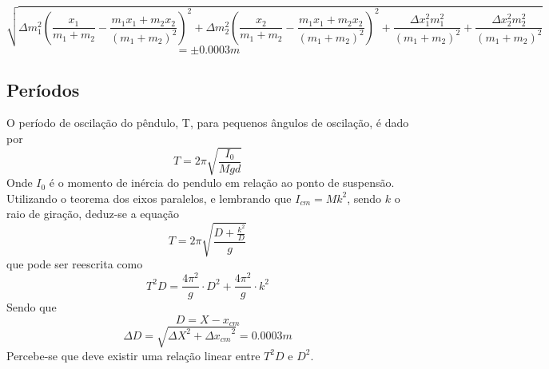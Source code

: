 \documentclass[12pt,a4paper]{article}
\begin{document}
$$ \sqrt{\Delta m_{1}^{2} \left(\frac{x_{1}}{m_{1} + m_{2}} - \frac{m_{1} x_{1} + m_{2} x_{2}}{\left(m_{1} + m_{2}\right)^{2}}\right)^{2} + \Delta m_{2}^{2} \left(\frac{x_{2}}{m_{1} + m_{2}} - \frac{m_{1} x_{1} + m_{2} x_{2}}{\left(m_{1} + m_{2}\right)^{2}}\right)^{2} + \frac{\Delta x_{1}^{2} m_{1}^{2}}{\left(m_{1} + m_{2}\right)^{2}} + \frac{\Delta x_{2}^{2} m_{2}^{2}}{\left(m_{1} + m_{2}\right)^{2}}}
$$
$$ = \pm 0.0003m $$ 


\subsection{Períodos}
O período de oscilação do pêndulo, T, para pequenos ângulos de oscilação, é dado por
$$ T = 2 \pi \sqrt{\frac{I_0}{Mgd}} $$
Onde $I_0$ é o momento de inércia do pendulo em relação ao ponto de suspensão.
Utilizando o teorema dos eixos paralelos, e lembrando que $I_{cm} = Mk^2$, sendo 
$k$ o raio de giração, deduz-se a equação
$$ T = 2\pi\sqrt{\frac{D + \frac{k^2}{D}}{g}} $$ 
que pode ser reescrita como 
\begin{equation} \label{eq:funcao}
 T^2D = \frac{4\pi^2}{g} \cdot D^2 + \frac{4\pi^2}{g} \cdot k^2 
\end{equation}
Sendo que $$D = X - x_{cm} $$ 
$$ \Delta D = \sqrt{{\Delta X}^2 + {\Delta x_{cm}}^2}  = 0.0003 m$$
Percebe-se que deve existir uma relação linear entre $T^2D$ e $D^2$.
\end{document}
